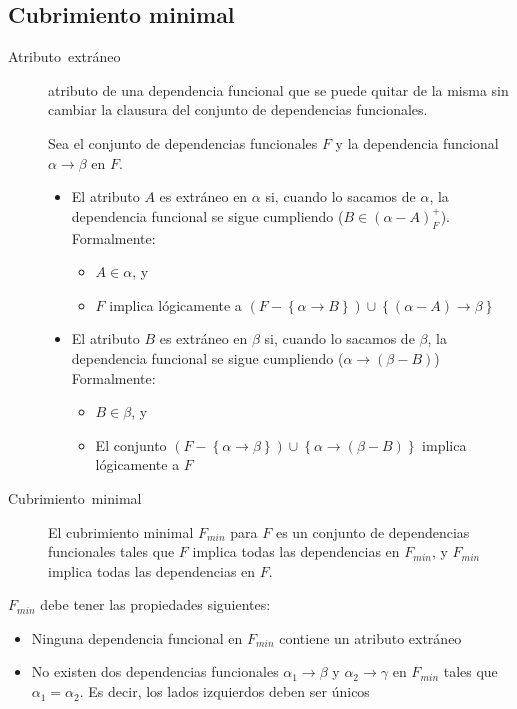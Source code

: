 \documentclass[a4paper, twoside]{article}
\begin{document}
\subsection{Cubrimiento minimal}
\begin{description}
\item [{Atributo~extráneo}] atributo de una dependencia funcional que
se puede quitar de la misma sin cambiar\emph{ }la clausura del conjunto
de dependencias funcionales. 


Sea el conjunto de dependencias funcionales $F$ y la dependencia
funcional $\alpha\to\beta$ en $F$.
\begin{itemize}
\item El atributo $A$ es extráneo en $\alpha$ si, cuando lo sacamos de
$\alpha$, la dependencia funcional se sigue cumpliendo ($B\in(\alpha-A)_{F}^{+}$).
Formalmente:

\begin{itemize}
\item $A\in\alpha$, y
\item $F$ implica lógicamente a $\left(F-\left\{ \alpha\to B\right\} \right)\cup\left\{ \left(\alpha-A\right)\to\beta\right\} $
\end{itemize}
\item El atributo $B$ es extráneo en $\beta$ si, cuando lo sacamos de
$\beta$, la dependencia funcional se sigue cumpliendo ($\alpha\to(\beta-B)$)
Formalmente:

\begin{itemize}
\item $B\in\beta$, y
\item El conjunto $\left(F-\left\{ \alpha\to\beta\right\} \right)\cup\left\{ \alpha\to\left(\beta-B\right)\right\} $
implica lógicamente a $F$
\end{itemize}
\end{itemize}
\item [{Cubrimiento~minimal}] El cubrimiento minimal $F_{min}$ para $F$
es un conjunto de dependencias funcionales tales que $F$ implica
todas las dependencias en $F_{min}$, y $F_{min}$ implica todas las
dependencias en $F$. 
\end{description}
$F_{min}$ debe tener las propiedades siguientes:
\begin{itemize}
\item Ninguna dependencia funcional en $F_{min}$ contiene un atributo extráneo
\item No existen dos dependencias funcionales $\alpha_{1}\to\beta$ y $\alpha_{2}\to\gamma$
en $F_{min}$ tales que $\alpha_{1}=\alpha_{2}$. Es decir, los lados
izquierdos deben ser únicos
\end{itemize}
\end{document}
